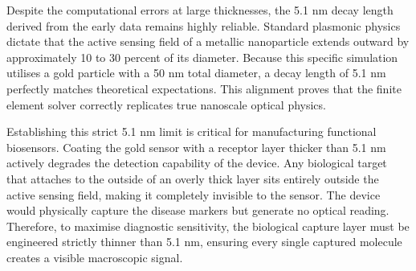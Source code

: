 \documentclass[class=report, crop=false]{standalone}
\begin{document}
\vspace{12pt}

Despite the computational errors at large thicknesses, the 5.1 nm decay length derived from the early data remains highly reliable. Standard plasmonic physics dictate that the active sensing field of a metallic nanoparticle extends outward by approximately 10 to 30 percent of its diameter. Because this specific simulation utilises a gold particle with a 50 nm total diameter, a decay length of 5.1 nm perfectly matches theoretical expectations. This alignment proves that the finite element solver correctly replicates true nanoscale optical physics.

\vspace{12pt}

Establishing this strict 5.1 nm limit is critical for manufacturing functional biosensors. Coating the gold sensor with a receptor layer thicker than 5.1 nm actively degrades the detection capability of the device. Any biological target that attaches to the outside of an overly thick layer sits entirely outside the active sensing field, making it completely invisible to the sensor. The device would physically capture the disease markers but generate no optical reading. Therefore, to maximise diagnostic sensitivity, the biological capture layer must be engineered strictly thinner than 5.1 nm, ensuring every single captured molecule creates a visible macroscopic signal.
\end{document}
